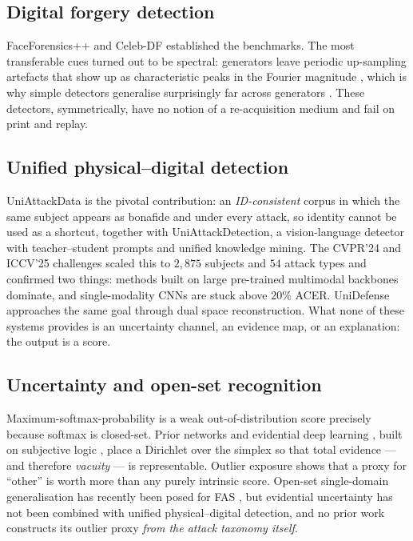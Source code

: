 \documentclass[conference]{IEEEtran}
\begin{document}
\subsection{Digital forgery detection}
FaceForensics++ \cite{rossler2019ff} and Celeb-DF \cite{li2020celebdf} established
the benchmarks. The most transferable cues turned out to be spectral: generators
leave periodic up-sampling artefacts \cite{odena2016checkerboard} that show up as
characteristic peaks in the Fourier magnitude \cite{frank2020frequency}, which is
why simple detectors generalise surprisingly far across generators
\cite{wang2020cnnspot}. These detectors, symmetrically, have no notion of a
re-acquisition medium and fail on print and replay.

\subsection{Unified physical--digital detection}
UniAttackData \cite{yu2024unified} is the pivotal contribution: an
\emph{ID-consistent} corpus in which the same subject appears as bonafide and under
every attack, so identity cannot be used as a shortcut, together with
UniAttackDetection, a vision-language detector with teacher--student prompts and
unified knowledge mining. The CVPR'24 and ICCV'25 challenges
\cite{yuan2024challenge,ma2025uniattackplus} scaled this to $2{,}875$ subjects and
$54$ attack types and confirmed two things: methods built on large pre-trained
multimodal backbones dominate, and single-modality CNNs are stuck above $20\%$
ACER. UniDefense \cite{zhang2024unidefense} approaches the same goal through dual
space reconstruction. What none of these systems provides is an uncertainty
channel, an evidence map, or an explanation: the output is a score.

\subsection{Uncertainty and open-set recognition}
Maximum-softmax-probability \cite{hendrycks2017msp} is a weak out-of-distribution
score precisely because softmax is closed-set. Prior networks
\cite{malinin2018prior} and evidential deep learning \cite{sensoy2018edl}, built on
subjective logic \cite{josang2016subjective}, place a Dirichlet over the simplex so
that total evidence --- and therefore \emph{vacuity} --- is representable.
Outlier exposure \cite{hendrycks2019oe} shows that a proxy for ``other'' is worth
more than any purely intrinsic score. Open-set single-domain generalisation has
recently been posed for FAS \cite{liu2024openset}, but evidential uncertainty has
not been combined with unified physical--digital detection, and no prior work
constructs its outlier proxy \emph{from the attack taxonomy itself}.
\end{document}
